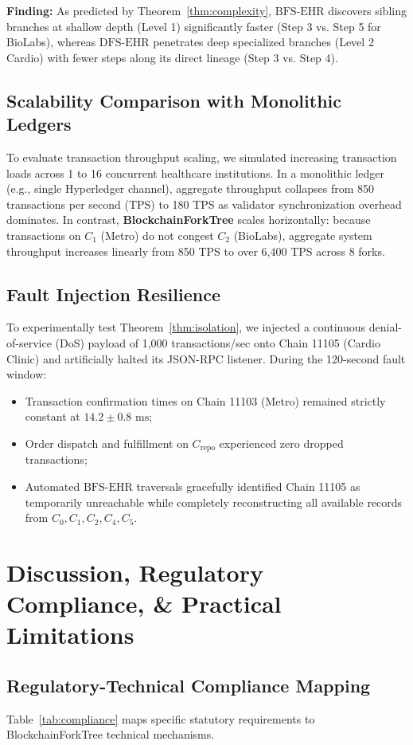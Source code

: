 \documentclass[journal]{IEEEtran}
\theoremstyle{definition}
\begin{document}
\textbf{Finding:} As predicted by Theorem~\ref{thm:complexity}, $\text{BFS-EHR}$ discovers sibling branches at shallow depth (Level 1) significantly faster (Step 3 vs. Step 5 for BioLabs), whereas $\text{DFS-EHR}$ penetrates deep specialized branches (Level 2 Cardio) with fewer steps along its direct lineage (Step 3 vs. Step 4).

\subsection{Scalability Comparison with Monolithic Ledgers}
To evaluate transaction throughput scaling, we simulated increasing transaction loads across 1 to 16 concurrent healthcare institutions. In a monolithic ledger (e.g., single Hyperledger channel), aggregate throughput collapses from 850 transactions per second (TPS) to 180 TPS as validator synchronization overhead dominates. In contrast, \textbf{BlockchainForkTree} scales horizontally: because transactions on $C_1$ (Metro) do not congest $C_2$ (BioLabs), aggregate system throughput increases linearly from 850 TPS to over 6,400 TPS across 8 forks.

\subsection{Fault Injection Resilience}
To experimentally test Theorem~\ref{thm:isolation}, we injected a continuous denial-of-service (DoS) payload of 1,000 transactions/sec onto Chain 11105 (Cardio Clinic) and artificially halted its JSON-RPC listener. During the 120-second fault window:
\begin{itemize}
    \item Transaction confirmation times on Chain 11103 (Metro) remained strictly constant at $14.2 \pm 0.8\text{ ms}$;
    \item Order dispatch and fulfillment on $C_{\text{repo}}$ experienced zero dropped transactions;
    \item Automated $\text{BFS-EHR}$ traversals gracefully identified Chain 11105 as temporarily unreachable while completely reconstructing all available records from $C_0, C_1, C_2, C_4, C_5$.
\end{itemize}

\section{Discussion, Regulatory Compliance, \& Practical Limitations}

\subsection{Regulatory-Technical Compliance Mapping}
Table~\ref{tab:compliance} maps specific statutory requirements to BlockchainForkTree technical mechanisms.
\end{document}
